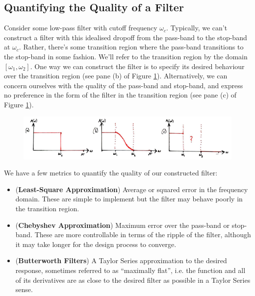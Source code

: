 \subsection{Quantifying the Quality of a Filter}
%
Consider some low-pass filter with cutoff frequency $\omega_c$. Typically,
we can't construct a filter with this idealised dropoff from the pass-band
to the stop-band at $\omega_c$. Rather, there's some transition region where
the pass-band transitions to the stop-band in some fashion. We'll refer to
the transition region by the domain $[\omega_1,\omega_2]$. One way we can
construct the filter is to specify its desired behaviour over the transition
region (see pane (b) of Figure \ref{fig::lecture_16_filter_quality}).
Alternatively, we can concern ourselves with the
quality of the pass-band and stop-band, and express no preference in the
form of the filter in the transition region (see pane (c) of
Figure \ref{fig::lecture_16_filter_quality}).\\
%
\begin{figure}[!htb]
  \includegraphics[width=\textwidth]{images/lecture_16_filter_quality.JPG}
  \caption{
  }
  \label{fig::lecture_16_filter_quality}
\end{figure}
%
We have a few metrics to quantify the quality of our constructed filter:
%
\begin{itemize}
\item (\textbf{Least-Square Approximation}) Average or squared error in the
  frequency domain. These are simple to implement but the filter may behave
  poorly in the transition region.
\item (\textbf{Chebyshev Approximation}) Maximum error over the pass-band or
  stop-band. These are more controllable in terms of the ripple of the filter,
  although it may take longer for the design process to converge.
\item (\textbf{Butterworth Filters}) A Taylor Series approximation to the
  desired response, sometimes referred to as ``maximally flat'', i.e. the function
  and all of its derivatives are as close to the desired filter as possible
  in a Taylor Series sense.
\end{itemize}


